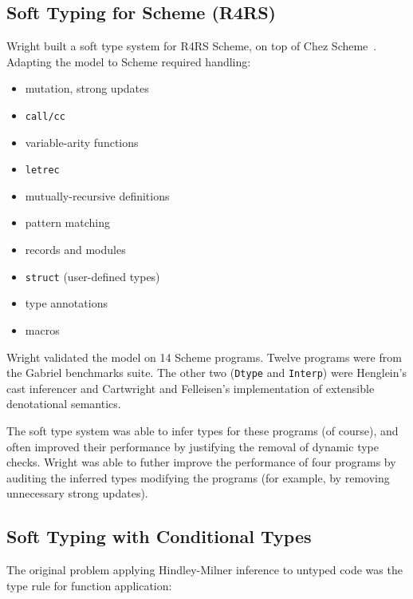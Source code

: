 \documentclass{article}
\begin{document}
\subsection*{Soft Typing for Scheme (R4RS)}

Wright built a soft type system for R4RS Scheme, on top of Chez Scheme~\cite{w-thesis-1994}.
Adapting the model to Scheme required handling:
\begin{itemize}
\item mutation, strong updates
\item {\tt call/cc}
\item variable-arity functions
\item {\tt letrec}
\item mutually-recursive definitions
\item pattern matching
\item records and modules
\item {\tt struct} (user-defined types)
\item type annotations
\item macros
\end{itemize}

Wright validated the model on 14 Scheme programs.
Twelve programs were from the Gabriel benchmarks suite.
The other two ({\tt Dtype} and {\tt Interp}) were Henglein's cast inferencer
 and Cartwright and Felleisen's implementation of extensible denotational
 semantics.

The soft type system was able to infer types for these programs (of course),
 and often improved their performance by justifying the removal of dynamic
 type checks.
Wright was able to futher improve the performance of four programs by
 auditing the inferred types modifying the programs (for example, by removing
 unnecessary strong updates).


\subsection*{Soft Typing with Conditional Types}
\label{sec:awl-popl-1994}

The original problem applying Hindley-Milner inference to untyped code
 was the type rule for function application:

\begin{mathpar}
\end{mathpar}
\end{document}
